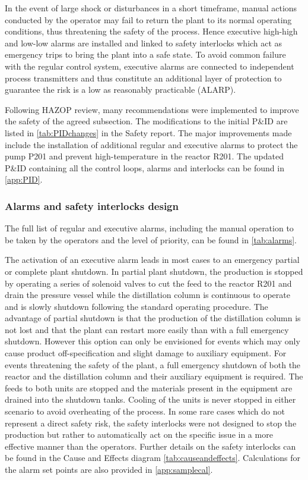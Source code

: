 In the event of large shock or disturbances in a short timeframe, manual actions conducted by the operator may fail to return the plant to its normal operating conditions, thus threatening the safety of the process. Hence executive high-high and low-low alarms are installed and linked to safety interlocks which act as emergency trips to bring the plant into a safe state. To avoid common failure with the regular control system, executive alarms are connected to independent process transmitters and thus constitute an additional layer of protection to guarantee the risk is a low as reasonably practicable (ALARP).  

Following HAZOP review, many recommendations were implemented to improve the safety of the agreed subsection. The modifications to the initial P\&ID are listed in \cref{tab:PIDchanges} in the Safety report. The major improvements made include the installation of additional regular and executive alarms to protect the pump P201 and prevent high-temperature in the reactor R201. The updated P\&ID containing all the control loops, alarms and interlocks can be found in \cref{app:PID}.
 

\subsubsection{Alarms and safety interlocks design}

The full list of regular and executive alarms, including the manual operation to be taken by the operators and the level of priority, can be found in \cref{tab:alarms}. 

The activation of an executive alarm leads in most cases to an emergency partial or complete plant shutdown. In partial plant shutdown, the production is stopped by operating a series of solenoid valves to cut the feed to the reactor R201 and drain the pressure vessel while the distillation column is continuous to operate and is slowly shutdown following the standard operating procedure. The advantage of partial shutdown is that the production of the distillation column is not lost and that the plant can restart more easily than with a full emergency shutdown. However this option can only be envisioned for events which may only cause product off-specification and slight damage to auxiliary equipment. For events threatening the safety of the plant, a full emergency shutdown of both the reactor and the distillation column and their auxiliary equipment is required. The feeds to both units are stopped and the materials present in the equipment are drained into the shutdown tanks. Cooling of the units is never stopped in either scenario to avoid overheating of the process. In some rare cases which do not represent a direct safety risk, the safety interlocks were not designed to stop the production but rather to automatically act on the specific issue in a more effective manner than the operators. Further details on the safety interlocks can be found in the Cause and Effects diagram \cref{tab:causeandeffects}. Calculations for the alarm set points are also provided in \cref{app:samplecal}.


